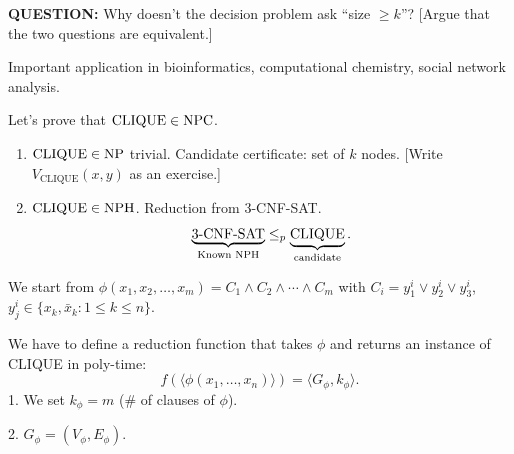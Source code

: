 \textbf{QUESTION:} Why doesn't the decision problem ask ``size $\geq k$''? [Argue that the two questions are equivalent.]

Important application in bioinformatics, computational chemistry, social network analysis.

Let's prove that $\mathrm{CLIQUE}\in\mathrm{NPC}$.
\begin{enumerate}
\item $\mathrm{CLIQUE}\in\mathrm{NP}$ trivial. Candidate certificate: set of $k$ nodes.
[Write $V_{\mathrm{CLIQUE}}(x,y)$ as an exercise.]
\item $\mathrm{CLIQUE}\in\mathrm{NPH}$. Reduction from 3-CNF-SAT.
\[
\underbrace{\mathrm{3\text{-}CNF\text{-}SAT}}_{\text{Known NPH}}\leq_p\underbrace{\mathrm{CLIQUE}}_{\text{candidate}}.
\]
\end{enumerate}
We start from $\phi(x_1,x_2,\ldots,x_m)=C_1\land C_2\land\cdots\land C_m$
with $C_i=y_1^i\lor y_2^i\lor y_3^i$, $y_j^i\in\{x_k,\bar x_k:1\leq k\leq n\}$.

We have to define a reduction function that takes $\phi$ and returns an instance of CLIQUE in poly-time:
\[
f(\langle\phi(x_1,\ldots,x_n)\rangle)=\langle G_\phi,k_\phi\rangle.
\]
1. We set $k_\phi=m$ ($\#$ of clauses of $\phi$).

2. $G_\phi=(V_\phi,E_\phi)$.
